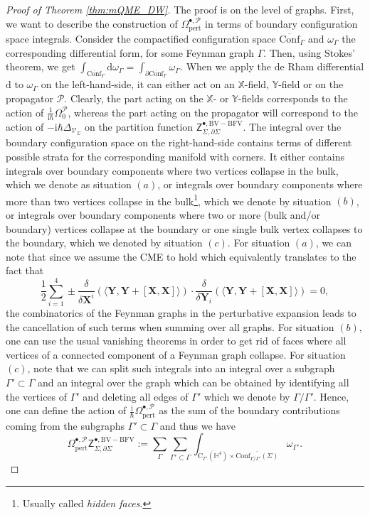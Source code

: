 \documentclass[11pt,colorinlistoftodos]{amsart}
\numberwithin{equation}{subsection}
\theoremstyle{plain}
\theoremstyle{definition}
\theoremstyle{remark}
\newcommand{\dd}{{\mathrm{d}}}
\newcommand{\de}{\partial}
\newcommand{\calP}{\mathcal{P}}
\newcommand{\I}{\mathrm{i}}
\newcommand{\calV}{\mathcal{V}}
\begin{document}
\begin{proof}[Proof of Theorem \ref{thm:mQME_DW}]
The proof is on the level of graphs. First, we want to describe the construction of $\Omega^{\bullet,\calP}_\mathrm{pert}$ in terms of boundary configuration space integrals. Consider the compactified configuration space $\overline{\mathrm{Conf}}_\Gamma$ and $\omega_\Gamma$ the corresponding differential form, for some Feynman graph $\Gamma$. Then, using Stokes' theorem, we get $\int_{\overline{\mathrm{Conf}}_\Gamma}\dd\omega_\Gamma=\int_{\de\overline{\mathrm{Conf}}_\Gamma}\omega_\Gamma$. When we apply the de Rham differential $\dd$ to $\omega_\Gamma$ on the left-hand-side, it can either act on an $\mathds{X}$-field, $\mathds{Y}$-field or on the propagator $\mathscr{P}$. Clearly, the part acting on the $\mathds{X}$- or $\mathds{Y}$-fields corresponds to the action of $\frac{1}{\I\hbar}\Omega_0^\calP$, whereas the part acting on the propagator will correspond to the action of $-\I\hbar\Delta_{\calV_\Sigma}$ on the partition function $\mathsf{Z}^{\bullet,\scriptscriptstyle\mathrm{BV-BFV}}_{\Sigma,\de\Sigma}$. The integral over the boundary configuration space on the right-hand-side contains terms of different possible strata for the corresponding manifold with corners. It either contains integrals over boundary components where two vertices collapse in the bulk, which we denote as situation $(a)$, or integrals over boundary components where more than two vertices collapse in the bulk\footnote{Usually called \emph{hidden faces}.}, which we denote by situation $(b)$, or integrals over boundary components where two or more (bulk and/or boundary) vertices collapse at the boundary or one single bulk vertex collapses to the boundary, which we denoted by situation $(c)$. For situation $(a)$, we can note that since we assume the CME to hold which equivalently translates to the fact that 
\[
\frac{1}{2}\sum_{i=1}^4\pm \frac{\delta}{\delta\mathbf{X}^i}\left(\langle\mathbf{Y},\mathbf{Y}+[\mathbf{X},\mathbf{X}]\rangle\right)\cdot \frac{\delta}{\delta\mathbf{Y}_i}\left(\langle\mathbf{Y},\mathbf{Y}+[\mathbf{X},\mathbf{X}]\rangle\right)=0,
\]
the combinatorics of the Feynman graphs in the perturbative expansion leads to the cancellation of such terms when summing over all graphs. For situation $(b)$, one can use the usual vanishing theorems \cite{K,Kontsevich1993_2,Bott1996,BottTaubes1994} in order to get rid of faces where all vertices of a connected component of a Feynman graph collapse. For situation $(c)$, note that we can split such integrals into an integral over a subgraph $\Gamma'\subset\Gamma$ and an integral over the graph which can be obtained by identifying all the vertices of $\Gamma'$ and deleting all edges of $\Gamma'$ which we denote by $\Gamma/\Gamma'$. Hence, one can define the action of $\frac{\I}{\hbar}\Omega^{\bullet,\calP}_\mathrm{pert}$ as the sum of the boundary contributions coming from the subgraphs $\Gamma'\subset \Gamma$ and thus we have 
\[
\Omega^{\bullet,\calP}_\mathrm{pert}\mathsf{Z}^{\bullet,\scriptscriptstyle\mathrm{BV-BFV}}_{\Sigma,\de\Sigma}:=\sum_\Gamma\sum_{\Gamma'\subset\Gamma}\int_{\overline{\mathrm{C}_{\Gamma'}(\mathbb{H}^4)}\times \overline{\mathrm{Conf}_{\Gamma/\Gamma'}(\Sigma)}}\omega_{\Gamma'}.
\]


\end{proof}
\end{document}
